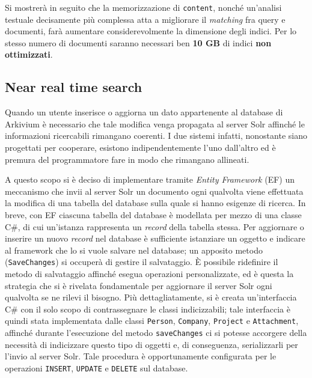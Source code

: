 Si mostrerà in seguito che la memorizzazione di \texttt{content}, nonché un’analisi testuale decisamente più complessa atta a migliorare il \textit{matching} fra query e documenti, farà aumentare considerevolmente la dimensione degli indici. Per lo stesso numero di documenti saranno necessari ben \textbf{10 GB} di indici \textbf{non ottimizzati}.



\pagebreak
\subsection{Near real time search}
\label{sec:realtimeindexing}

Quando un utente inserisce o aggiorna un dato appartenente al database di Arkivium è necessario che tale modifica venga propagata al server Solr affinché le informazioni ricercabili rimangano coerenti. I due sistemi infatti, nonostante siano progettati per cooperare, esistono indipendentemente l’uno dall’altro ed è premura del programmatore fare in modo che rimangano allineati.

A questo scopo si è deciso di implementare tramite \textit{Entity Framework} (EF) un meccanismo che invii al server Solr un documento ogni qualvolta viene effettuata la modifica di una tabella del database sulla quale si hanno esigenze di ricerca. In breve, con EF ciascuna tabella del database è modellata per mezzo di una classe C\#, di cui un’istanza rappresenta un \textit{record} della tabella stessa. Per aggiornare o inserire un nuovo \textit{record} nel database è sufficiente istanziare un oggetto e indicare al framework che lo si vuole salvare nel database; un apposito metodo (\texttt{SaveChanges}) si occuperà di gestire il salvataggio. È possibile ridefinire il metodo di salvataggio affinché esegua operazioni personalizzate, ed è questa la strategia che si è rivelata fondamentale per aggiornare il server Solr ogni qualvolta se ne rilevi il bisogno. Più dettagliatamente, si è creata un’interfaccia C\# con il solo scopo di contrassegnare le classi indicizzabili; tale interfaccia è quindi stata implementata dalle classi \texttt{Person}, \texttt{Company}, \texttt{Project} e \texttt{Attachment}, affinché durante l’esecuzione del metodo \texttt{saveChanges} ci si potesse accorgere della necessità di indicizzare questo tipo di oggetti e, di conseguenza, serializzarli per l’invio al server Solr. Tale procedura è opportunamente configurata per le operazioni \texttt{INSERT}, \texttt{UPDATE} e \texttt{DELETE} sul database.

